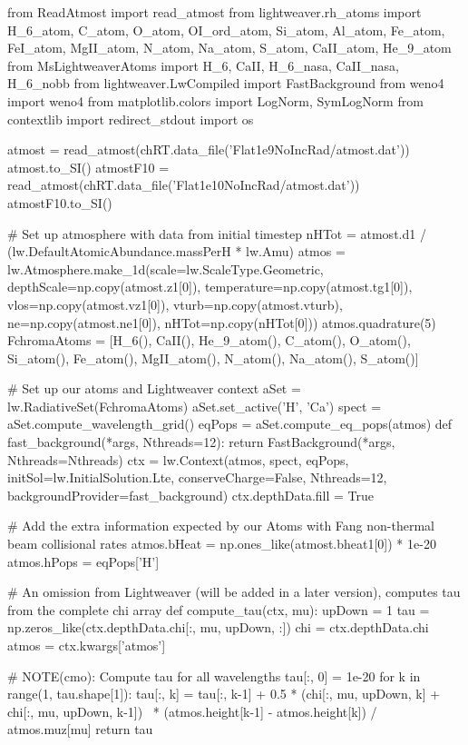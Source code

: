 \begin{pycode}[TimeDepRT]
from ReadAtmost import read_atmost
from lightweaver.rh_atoms import H_6_atom, C_atom, O_atom, OI_ord_atom, Si_atom, Al_atom, Fe_atom, FeI_atom, MgII_atom, N_atom, Na_atom, S_atom, CaII_atom, He_9_atom
from MsLightweaverAtoms import H_6, CaII, H_6_nasa, CaII_nasa, H_6_nobb
from lightweaver.LwCompiled import FastBackground
from weno4 import weno4
from matplotlib.colors import LogNorm, SymLogNorm
from contextlib import redirect_stdout
import os

atmost = read_atmost(chRT.data_file('Flat1e9NoIncRad/atmost.dat'))
atmost.to_SI()
atmostF10 = read_atmost(chRT.data_file('Flat1e10NoIncRad/atmost.dat'))
atmostF10.to_SI()

# Set up atmosphere with data from initial timestep
nHTot = atmost.d1 / (lw.DefaultAtomicAbundance.massPerH * lw.Amu)
atmos = lw.Atmosphere.make_1d(scale=lw.ScaleType.Geometric, depthScale=np.copy(atmost.z1[0]),
                              temperature=np.copy(atmost.tg1[0]), vlos=np.copy(atmost.vz1[0]),
                              vturb=np.copy(atmost.vturb), ne=np.copy(atmost.ne1[0]), nHTot=np.copy(nHTot[0]))
atmos.quadrature(5)
FchromaAtoms = [H_6(), CaII(), He_9_atom(), C_atom(), O_atom(), Si_atom(), Fe_atom(),
                MgII_atom(), N_atom(), Na_atom(), S_atom()]

# Set up our atoms and Lightweaver context
aSet = lw.RadiativeSet(FchromaAtoms)
aSet.set_active('H', 'Ca')
spect = aSet.compute_wavelength_grid()
eqPops = aSet.compute_eq_pops(atmos)
def fast_background(*args, Nthreads=12):
    return FastBackground(*args, Nthreads=Nthreads)
ctx = lw.Context(atmos, spect, eqPops, initSol=lw.InitialSolution.Lte, conserveCharge=False, Nthreads=12, backgroundProvider=fast_background)
ctx.depthData.fill = True

# Add the extra information expected by our Atoms with Fang non-thermal beam collisional rates
atmos.bHeat = np.ones_like(atmost.bheat1[0]) * 1e-20
atmos.hPops = eqPops['H']

# An omission from Lightweaver (will be added in a later version), computes tau from the complete chi array
def compute_tau(ctx, mu):
    upDown = 1
    tau = np.zeros_like(ctx.depthData.chi[:, mu, upDown, :])
    chi = ctx.depthData.chi
    atmos = ctx.kwargs['atmos']

    # NOTE(cmo): Compute tau for all wavelengths
    tau[:, 0] = 1e-20
    for k in range(1, tau.shape[1]):
        tau[:, k] = tau[:, k-1] + 0.5 * (chi[:, mu, upDown, k] + chi[:, mu, upDown, k-1]) \
                                      * (atmos.height[k-1] - atmos.height[k]) / atmos.muz[mu]
    return tau


\end{pycode}
